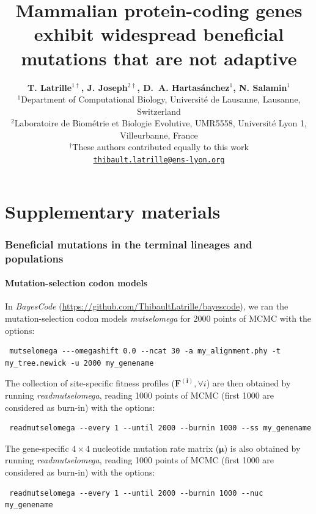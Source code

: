 \documentclass{article}
\title{\textbf{Mammalian protein-coding genes exhibit widespread beneficial mutations that are not adaptive}}
\author{
    \large
    \textbf{T. {Latrille}$^{1\dag}$\orcidlink{0000-0002-9643-4668}, J. {Joseph}$^{2\dag}$\orcidlink{0009-0002-1312-9930}, D.~A. {Hartasánchez}$^{1}$\orcidlink{0000-0003-2596-6883}, N. {Salamin}$^{1}$\orcidlink{0000-0002-3963-4954}}\\
    \scriptsize $^{1}$Department of Computational Biology, Université de Lausanne, Lausanne, Switzerland\\
    \scriptsize $^{2}$Laboratoire de Biométrie et Biologie Evolutive, UMR5558, Université Lyon 1, Villeurbanne, France \\
    \scriptsize $^{\dag}$These authors contributed equally to this work\\
    \normalsize \texttt{\href{mailto:thibault.latrille@ens-lyon.org}{thibault.latrille@ens-lyon.org}} \\
}
\date{}
\newcommand{\UniDimArray}[1]{\bm{#1}}
\begin{document}
    \maketitle
    \part*{Supplementary materials}
    \tableofcontents
    \clearpage


    \section{Beneficial mutations in the terminal lineages and populations}\label{sec:beneficial-mutations}

    \subsection{Mutation-selection codon models}
    \label{sec:site-specific-mutation-selection-codon-models}
    In \textit{BayesCode} (\url{https://github.com/ThibaultLatrille/bayescode}), we ran the mutation-selection codon models \textit{mutselomega} for 2000 points of MCMC with the options:
    \begin{scriptsize}
        \begin{verbatim}
 mutselomega ---omegashift 0.0 --ncat 30 -a my_alignment.phy -t my_tree.newick -u 2000 my_genename
        \end{verbatim}
    \end{scriptsize}
    The collection of site-specific fitness profiles ($\UniDimArray{F^{(i)}}, \forall i$) are then obtained by running \textit{readmutselomega}, reading 1000 points of MCMC (first 1000 are considered as burn-in) with the options:
    \begin{scriptsize}
        \begin{verbatim}
 readmutselomega --every 1 --until 2000 --burnin 1000 --ss my_genename
        \end{verbatim}
    \end{scriptsize}
    The gene-specific $4 \times 4$ nucleotide mutation rate matrix ($\UniDimArray{\mu}$) is also obtained by running \textit{readmutselomega}, reading 1000 points of MCMC (first 1000 are considered as burn-in) with the options:
    \begin{scriptsize}
        \begin{verbatim}
 readmutselomega --every 1 --until 2000 --burnin 1000 --nuc my_genename
        \end{verbatim}
    \end{scriptsize}
\end{document}
